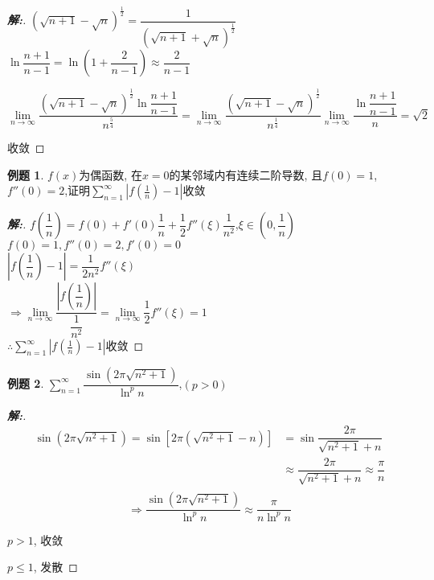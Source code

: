 \documentclass[12pt,a4paper]{ctexart}
\newenvironment{solution}{\begin{proof}[\hspace{2em}\textbf{解:}]}{\end{proof}}
\theoremstyle{definition}%
\newtheorem{exercise}{\hspace{2em}例题}
\begin{document}
\begin{solution}
	$ (\sqrt{n+1}-\sqrt{n})^{\frac{1}{2}}
	=\dfrac{1}{(\sqrt{n+1}+\sqrt{n})^{\frac{1}{2}}} $\\

	$ \ln\dfrac{n+1}{n-1}
	=\ln(1+\dfrac{2}{n-1})
	\approx\dfrac{2}{n-1} $
	
	\begin{equation*}
	\lim\limits_{n \to \infty}\dfrac{(\sqrt{n+1}-\sqrt{n})^{\frac{1}{2}}\ln\dfrac{n+1}{n-1}}{n^{\frac{5}{4}}}
	=\lim\limits_{n \to \infty}\dfrac{(\sqrt{n+1}-\sqrt{n})^{\frac{1}{2}}}{n^{\frac{1}{4}}}
	\lim\limits_{n \to \infty}\dfrac{\ln\dfrac{n+1}{n-1}}{n}
	=\sqrt{2}
	\end{equation*} 
	
	收敛
\end{solution}
\begin{exercise}
	$ f(x) $为偶函数, 在$x=0$的某邻域内有连续二阶导数, 且$ f(0)=1 $,$ f''(0)=2 $,证明$ \displaystyle\sum_{n=1}^{\infty} |f(\frac{1}{n})-1|$收敛
\end{exercise}
\begin{solution}
	$ f(\dfrac{1}{n})=f(0)+f'(0)\dfrac{1}{n}+\dfrac{1}{2}f''(\xi)\dfrac{1}{n^2} $,$ \xi \in (0,\dfrac{1}{n}) $\\
	
	$ f(0)=1,f''(0)=2,f'(0)=0 $\\
	
	$ \left|f(\dfrac{1}{n})-1\right|
	=\dfrac{1}{2n^2}f''(\xi) $\\
	
	$ \Rightarrow \lim\limits_{n \to \infty}\dfrac{|f(\dfrac{1}{n})|}{\dfrac{1}{n^2}}
	=\lim\limits_{n \to \infty}\dfrac{1}{2}f''(\xi)=1 $\\
	
	$ \therefore\displaystyle\sum_{n=1}^{\infty} |f(\frac{1}{n})-1|$收敛
	
\end{solution}
\begin{exercise}
	$ \displaystyle\sum_{n=1}^{\infty}\dfrac{\sin(2\pi\sqrt{n^2+1})}{\ln^p n} $,$ (p>0) $
\end{exercise}
\begin{solution}
	\begin{equation*}
	\begin{split}
	\sin(2\pi\sqrt{n^2+1})
	=\sin[2\pi(\sqrt{n^2+1}-n)] 
	&=\sin\dfrac{2\pi}{\sqrt{n^2+1}+n}\\
	&\approx\dfrac{2\pi}{\sqrt{n^2+1}+n}
	\approx\dfrac{\pi}{n}\\
	\end{split}
	\end{equation*}
	\begin{equation*}
	\Rightarrow\dfrac{\sin(2\pi\sqrt{n^2+1})}{\ln^p n}
	\approx\dfrac{\pi}{n\ln^p n}
	\end{equation*}
	
	$ p>1 $, 收敛
	
	$ p \le 1 $, 发散
\end{solution}
\end{document}
